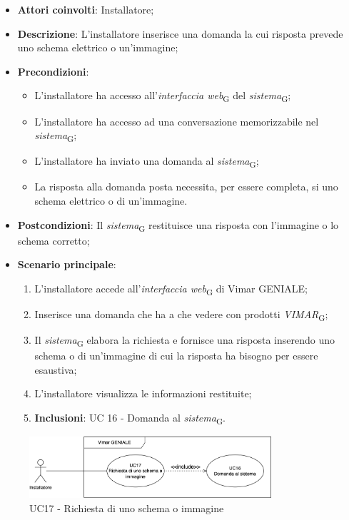 \begin{itemize}
    \item \textbf{Attori coinvolti}: Installatore;
    \item \textbf{Descrizione}: L’installatore inserisce una domanda la cui risposta prevede uno schema elettrico o un'immagine;
    \item \textbf{Precondizioni}: 
        \begin{itemize}
            \item L’installatore ha accesso all’\textit{interfaccia web}\textsubscript{G} del \textit{sistema}\textsubscript{G};
            \item L’installatore ha accesso ad una conversazione memorizzabile nel \textit{sistema}\textsubscript{G};
            \item L'installatore ha inviato una domanda al \textit{sistema}\textsubscript{G};
            \item La risposta alla domanda posta necessita, per essere completa, si uno schema elettrico o di un'immagine.
        \end{itemize}
    \item \textbf{Postcondizioni}: Il \textit{sistema}\textsubscript{G} restituisce una risposta con l'immagine o lo schema corretto;
    \item \textbf{Scenario principale}:
    \begin{enumerate}
    \item L’installatore accede all’\textit{interfaccia web}\textsubscript{G} di Vimar GENIALE;
    \item Inserisce una domanda che ha a che vedere con prodotti \textit{VIMAR}\textsubscript{G};
    \item Il \textit{sistema}\textsubscript{G} elabora la richiesta e fornisce una risposta inserendo uno schema o di un'immagine di cui la risposta ha bisogno per essere esaustiva;
    \item L’installatore visualizza le informazioni restituite;
    \item \textbf{Inclusioni}: UC 16 - Domanda al \textit{sistema}\textsubscript{G}.
    \end{enumerate}
\end{itemize}
\begin{figure}[H]
\centering
\includegraphics[width=0.8\textwidth]{contents/casi_duso/png/UC17.png}
\caption{UC17 - Richiesta di uno schema o immagine}
\end{figure}


